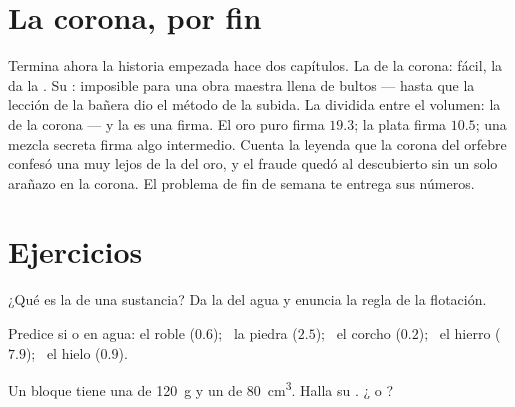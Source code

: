 \section{La corona, por fin}

\begin{example}\label{ex:g6:density-floating:crown}
Termina ahora la historia empezada hace dos capítulos. La  de
la corona: fácil, la da la . Su : imposible para una
obra maestra llena de bultos --- hasta que la lección de la bañera dio
el método de la subida. La  dividida entre el volumen: la
\emph{} de la corona --- y la  es una firma. El
oro puro firma $19.3$; la plata firma $10.5$; una mezcla secreta firma
algo intermedio. Cuenta la leyenda que la corona del orfebre confesó
una  muy lejos de la del oro, y el fraude quedó al
descubierto sin un solo arañazo en la corona. El problema de fin de
semana te entrega sus números.
\end{example}

\section{Ejercicios}

\begin{exercise}[$\star$]\label{exo:g6:density-floating:1}
¿Qué es la  de una sustancia? Da la del agua y enuncia la
regla de la flotación.
\end{exercise}

\begin{exercise}[$\star$]\label{exo:g6:density-floating:2}
Predice si  o  en agua: el roble ($0.6$); \ la
piedra ($2.5$); \ el corcho ($0.2$); \ el hierro ($7.9$); \ el hielo
($0.9$).
\end{exercise}

\begin{exercise}[$\star$]\label{exo:g6:density-floating:3}
Un bloque tiene una  de \qty{120}{g} y un  de
\qty{80}{cm^3}. Halla su . ¿ o ?
\end{exercise}

